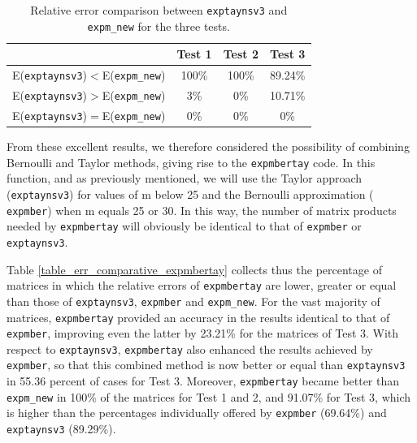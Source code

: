 \begin{table}[!t]\begin{center}
                \caption{Relative error comparison between \texttt{exptaynsv3} and \texttt{expm\_new} for the three tests.}
{\small
               \begin{tabular}{|c||c|c|c|}\hline & Test 1  &Test 2 & Test 3\\\hline
                        E(\texttt{exptaynsv3})$<$E(\texttt{expm\_new})    & 100\% & 100\% & 89.24\%\\\hline
                        E(\texttt{exptaynsv3})$>$E(\texttt{expm\_new})    &   3\% &     0\%  & 10.71\%\\\hline
                        E(\texttt{exptaynsv3})$=$E(\texttt{expm\_new})    &   0\% &     0\%  &       0\%\\\hline
                \end{tabular}}
                \label{table_err_comparative_exptaynsv3}
        \end{center}
\end{table}

From these excellent results, we therefore considered the possibility of combining Bernoulli and Taylor methods, giving rise to the \texttt{expmbertay} code. In this function, and as previously mentioned, we will use the Taylor approach (\texttt{exptaynsv3}) for values of m below 25 and the Bernoulli approximation ( \texttt{expmber}) when m equals 25 or 30. In this way, the number of matrix products needed by \texttt{expmbertay} will obviously be identical to that of \texttt{expmber} or \texttt{exptaynsv3}. 

Table \ref{table_err_comparative_expmbertay} collects thus the percentage of matrices in which the relative errors of \texttt{expmbertay} are lower, greater or equal than those of \texttt{exptaynsv3}, \texttt{expmber}  and \texttt{expm\_new}.  For the vast majority of matrices, \texttt{expmbertay} provided an accuracy in the results identical to that of \texttt{expmber}, improving even the latter by 23.21\% for the matrices of Test 3. With respect to \texttt{exptaynsv3}, \texttt{expmbertay} also enhanced the results achieved by \texttt{expmber}, so that this combined method is now better or equal than \texttt{exptaynsv3} in 55.36 percent of cases for Test 3. Moreover, \texttt{expmbertay} became better than \texttt{expm\_new} in 100\% of the matrices for Test 1 and 2, and 91.07\% for Test 3, which is higher than the percentages individually offered by \texttt{expmber} (69.64\%) and \texttt{exptaynsv3} (89.29\%).

